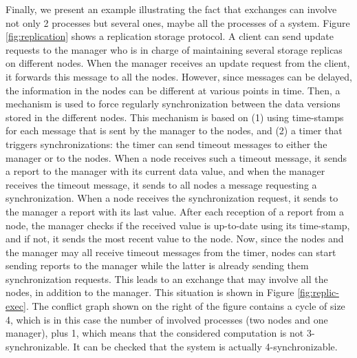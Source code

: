 %


Finally, we present an example illustrating the fact that exchanges can involve not only 2 processes but several ones, maybe all the processes of a system. Figure \ref{fig:replication} shows a replication storage protocol. A client can send update requests to the manager who is in charge of maintaining several storage replicas on different nodes. When the manager receives an update request from the client, it forwards this message to all the nodes. However, since messages can be delayed, the information in the nodes can be different at various points in time. Then, a mechanism is used to force regularly synchronization between the data versions stored in the different nodes. This mechanism is based on (1) using time-stamps for each message that is sent  by the manager to the nodes, and (2) a timer that triggers synchronizations: the timer can send timeout messages to either the manager or to the nodes. When a node receives such a timeout message, it sends a report to the manager with its current data value, and when the manager receives the timeout message, it sends to all nodes a message requesting a synchronization. When a node receives the synchronization request, it sends to the manager a report with its last value. After each reception of a report from a node, the manager checks if the received value is up-to-date using its time-stamp, and if not, it sends the most recent value to the node. Now, since the nodes and the manager may all receive timeout messages from the timer, nodes can start sending reports to the manager while the latter is already sending them synchronization requests. This leads to an exchange that may involve all the nodes, in addition to the manager. This situation is shown in Figure \ref{fig:replic-exec}. The conflict graph shown on the right of the figure contains a cycle of size 4, which is in this case the number of involved processes (two nodes and one manager), plus 1, which means that the considered computation is not 3-synchronizable. It can be checked that the system is actually 4-synchronizable. 



